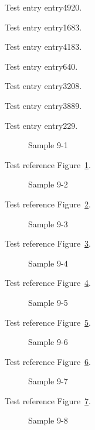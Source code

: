 Test entry \gls{entry4920}.

Test entry \gls{entry1683}.

Test entry \gls{entry4183}.

Test entry \gls{entry640}.

Test entry \gls{entry3208}.

Test entry \gls{entry3889}.

Test entry \gls{entry229}.

\begin{figure}[tbhp]
\caption{Sample 9-1}
\label{fig:sample-9-1}
\end{figure}

Test reference Figure~\ref{fig:sample-9-1}.

\begin{figure}[tbhp]
\caption{Sample 9-2}
\label{fig:sample-9-2}
\end{figure}

Test reference Figure~\ref{fig:sample-9-2}.

\begin{figure}[tbhp]
\caption{Sample 9-3}
\label{fig:sample-9-3}
\end{figure}

Test reference Figure~\ref{fig:sample-9-3}.

\begin{figure}[tbhp]
\caption{Sample 9-4}
\label{fig:sample-9-4}
\end{figure}

Test reference Figure~\ref{fig:sample-9-4}.

\begin{figure}[tbhp]
\caption{Sample 9-5}
\label{fig:sample-9-5}
\end{figure}

Test reference Figure~\ref{fig:sample-9-5}.

\begin{figure}[tbhp]
\caption{Sample 9-6}
\label{fig:sample-9-6}
\end{figure}

Test reference Figure~\ref{fig:sample-9-6}.

\begin{figure}[tbhp]
\caption{Sample 9-7}
\label{fig:sample-9-7}
\end{figure}

Test reference Figure~\ref{fig:sample-9-7}.

\begin{figure}[tbhp]
\caption{Sample 9-8}
\label{fig:sample-9-8}
\end{figure}

